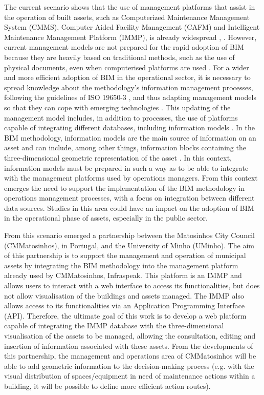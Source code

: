 \documentclass[a4paper, 10pt, twocolumn, twoside]{article}
\begin{document}
The current scenario shows that the use of management platforms that assist in the operation of built assets, such as Computerized Maintenance Management System (CMMS), Computer Aided Facility Management (CAFM) and Intelligent Maintenance Management Platform (IMMP), is already widespread \cite{Marocco2021}, \cite{Siccardi2023}. However, current management models are not prepared for the rapid adoption of BIM because they are heavily based on traditional methods, such as the use of physical documents, even when computerised platforms are used \cite{Siccardi2023}. For a wider and more efficient adoption of BIM in the operational sector, it is necessary to spread knowledge about the methodology's information management processes, following the guidelines of ISO 19650-3 \cite{19650-3}, and thus adapting management models so that they can cope with emerging technologies \cite{Durdyev2022}. This updating of the management model includes, in addition to processes, the use of platforms capable of integrating different databases, including information models \cite{Al-Kasasbeh2021}. In the BIM methodology, information models are the main source of information on an asset and can include, among other things, information blocks containing the three-dimensional geometric representation of the asset \cite{19650-1}. In this context, information models must be prepared in such a way as to be able to integrate with the management platforms used by operations managers. From this context emerges the need to support the implementation of the BIM methodology in operations management processes, with a focus on integration between different data sources. Studies in this area could have an impact on the adoption of BIM in the operational phase of assets, especially in the public sector.

From this scenario emerged a partnership between the Matosinhos City Council (CMMatosinhos), in Portugal, and the University of Minho (UMinho). The aim of this partnership is to support the management and operation of municipal assets by integrating the BIM methodology into the management platform already used by CMMatosinhos, Infraspeak. This platform is an IMMP and allows users to interact with a web interface to access its functionalities, but does not allow visualisation of the buildings and assets managed. The IMMP also allows access to its functionalities via an Application Programming Interface (API). Therefore, the ultimate goal of this work is to develop a web platform capable of integrating the IMMP database with the three-dimensional visualisation of the assets to be managed, allowing the consultation, editing and insertion of information associated with these assets. From the developments of this partnership, the management and operations area of CMMatosinhos will be able to add geometric information to the decision-making process (e.g. with the visual distribution of spaces/equipment in need of maintenance actions within a building, it will be possible to define more efficient action routes).
\end{document}
